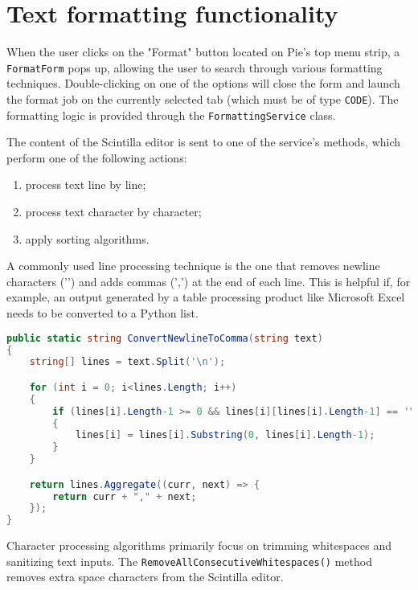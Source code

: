 \section{Text formatting functionality}

When the user clicks on the "Format" button located on Pie's top menu strip, a \texttt{FormatForm} pops up, allowing the user to search through various formatting techniques. Double-clicking on one of the options will close the form and launch the format job on the currently selected tab (which must be of type \texttt{CODE}). The formatting logic is provided through the \texttt{FormattingService} class.

The content of the Scintilla editor is sent to one of the service's methods, which perform one of the following actions:

\begin{enumerate}
  \item process text line by line;
  \item process text character by character;
  \item apply sorting algorithms.
\end{enumerate}

A commonly used line processing technique is the one that removes newline characters ('\n') and adds commas (',') at the end of each line. This is helpful if, for example, an output generated by a table processing product like Microsoft Excel needs to be converted to a Python list.

\begin{lstlisting}[language=csharp, caption={Converting newline to commas using the ConvertNewlineToComma() method from the FormattingService class}]
public static string ConvertNewlineToComma(string text)
{
    string[] lines = text.Split('\n');

    for (int i = 0; i<lines.Length; i++)
    {
        if (lines[i].Length-1 >= 0 && lines[i][lines[i].Length-1] == '\r')
        {
            lines[i] = lines[i].Substring(0, lines[i].Length-1);
        }
    }

    return lines.Aggregate((curr, next) => {
        return curr + "," + next;
    });
}
\end{lstlisting}

Character processing algorithms primarily focus on trimming whitespaces and sanitizing text inputs. The \texttt{RemoveAllConsecutiveWhitespaces()} method removes extra space characters from the Scintilla editor.

